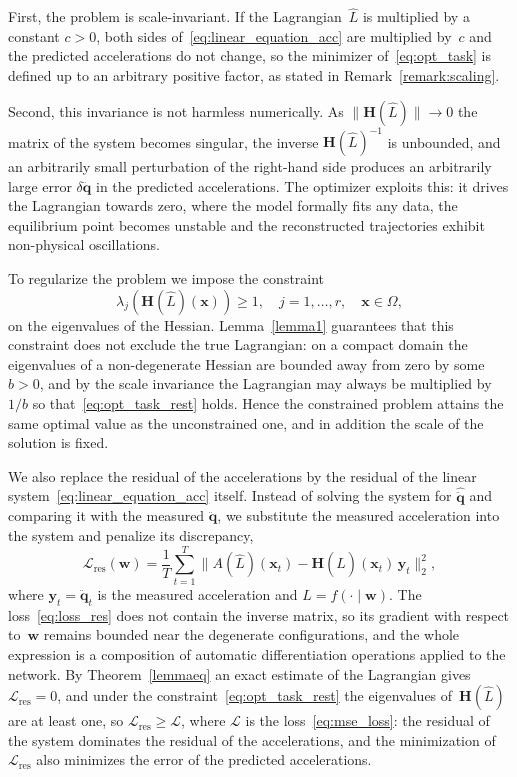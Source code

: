 \documentclass[sn-mathphys-num]{sn-jnl}
\theoremstyle{thmstylethree}
\theoremstyle{thmstyletwo}
\theoremstyle{thmstyleone}
\begin{document}
First, the problem is scale-invariant. If the Lagrangian~$\hat{L}$ is multiplied by a constant $c > 0$, both sides of~\eqref{eq:linear_equation_acc} are multiplied by~$c$ and the predicted accelerations do not change, so the minimizer of~\eqref{eq:opt_task} is defined up to an arbitrary positive factor, as stated in Remark~\ref{remark:scaling}.

Second, this invariance is not harmless numerically. As $\|\mathbf{H}(\hat{L})\| \to 0$ the matrix of the system becomes singular, the inverse $\mathbf{H}(\hat{L})^{-1}$ is unbounded, and an arbitrarily small perturbation of the right-hand side produces an arbitrarily large error $\delta \ddot{\mathbf{q}}$ in the predicted accelerations. The optimizer exploits this: it drives the Lagrangian towards zero, where the model formally fits any data, the equilibrium point becomes unstable and the reconstructed trajectories exhibit non-physical oscillations.

To regularize the problem we impose the constraint
\begin{equation}\label{eq:opt_task_rest}
    \lambda_j \left(\mathbf{H}(\hat{L})(\mathbf{x})\right) \ge 1,
    \quad j = 1, \dots, r,
    \quad \mathbf{x} \in \Omega,
\end{equation}
on the eigenvalues of the Hessian. Lemma~\ref{lemma1} guarantees that this constraint does not exclude the true Lagrangian: on a compact domain the eigenvalues of a non-degenerate Hessian are bounded away from zero by some $b > 0$, and by the scale invariance the Lagrangian may always be multiplied by $1/b$ so that~\eqref{eq:opt_task_rest} holds. Hence the constrained problem attains the same optimal value as the unconstrained one, and in addition the scale of the solution is fixed.

We also replace the residual of the accelerations by the residual of the linear system~\eqref{eq:linear_equation_acc} itself. Instead of solving the system for $\hat{\ddot{\mathbf{q}}}$ and comparing it with the measured $\ddot{\mathbf{q}}$, we substitute the measured acceleration into the system and penalize its discrepancy,
\begin{equation}
\label{eq:loss_res}
    \mathcal{L}_{\text{res}}(\mathbf{w}) = \frac{1}{T}\sum_{t=1}^{T} \bigl\| A(\hat{L})(\mathbf{x}_t) - \mathbf{H}(\hat{L})(\mathbf{x}_t)\, \mathbf{y}_t \bigr\|_2^2,
\end{equation}
where $\mathbf{y}_t = \ddot{\mathbf{q}}_t$ is the measured acceleration and $\hat{L} = f(\cdot \mid \mathbf{w})$. The loss~\eqref{eq:loss_res} does not contain the inverse matrix, so its gradient with respect to~$\mathbf{w}$ remains bounded near the degenerate configurations, and the whole expression is a composition of automatic differentiation operations applied to the network. By Theorem~\ref{lemmaeq} an exact estimate of the Lagrangian gives $\mathcal{L}_{\text{res}} = 0$, and under the constraint~\eqref{eq:opt_task_rest} the eigenvalues of~$\mathbf{H}(\hat{L})$ are at least one, so $\mathcal{L}_{\text{res}} \ge \mathcal{L}$, where $\mathcal{L}$ is the loss~\eqref{eq:mse_loss}: the residual of the system dominates the residual of the accelerations, and the minimization of $\mathcal{L}_{\text{res}}$ also minimizes the error of the predicted accelerations.
\end{document}
